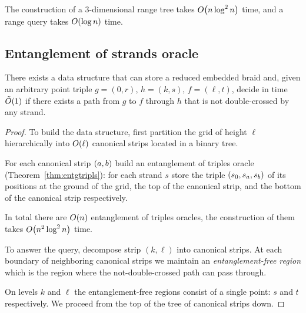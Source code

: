 \documentclass[a4paper,11pt]{article}
\begin{document}
\begin{remark}
	The construction of a 3-dimensional range tree takes \(O \lr*{n \log^2 n}\) time,
	and a range query takes \(O \lr*{\log n}\) time.
\end{remark}


\subsection{Entanglement of strands oracle}

\begin{theorem} \label{thm:entgstrands}
	There exists a data structure that can store a reduced embedded braid \braid and,
	given an arbitrary point triple \(g = (0,r)\), \(h = (k,s)\), \(f = (\ell,t)\),
	decide in time \(\Ot\lr*{1}\) if there exists a path from \(g\) to \(f\)
	through \(h\) that is not double-crossed by any strand.
\end{theorem}

\begin{proof}
	To build the data structure, first partition the grid of height \(\ell\) hierarchically into \(O\lr*{\ell}\) canonical strips located in a binary tree.

	For each canonical strip \(\lr*{a, b}\) build an entanglement of triples oracle (Theorem~\ref{thm:entgtripls}): for each strand \(s\) store the triple \(\lr*{s_0, s_a, s_b}\) of its positions at the ground of the grid, the top of the canonical strip, and the bottom of the canonical strip respectively.

	In total there are \(O\lr*{n}\) entanglement of triples oracles, the construction of them takes \(O\lr*{n^2 \log^2 n}\) time.

	To answer the query, decompose strip \((k,\ell)\) into canonical strips. At each boundary of neighboring canonical strips we maintain an \emph{entanglement-free region} which is the region where the not-double-crossed path can pass through.

	On levels \(k\) and \(\ell\) the entanglement-free regions consist of a single point: \(s\) and \(t\) respectively. We proceed from the top of the tree of canonical strips down. 
\end{proof}

%
\end{document}
